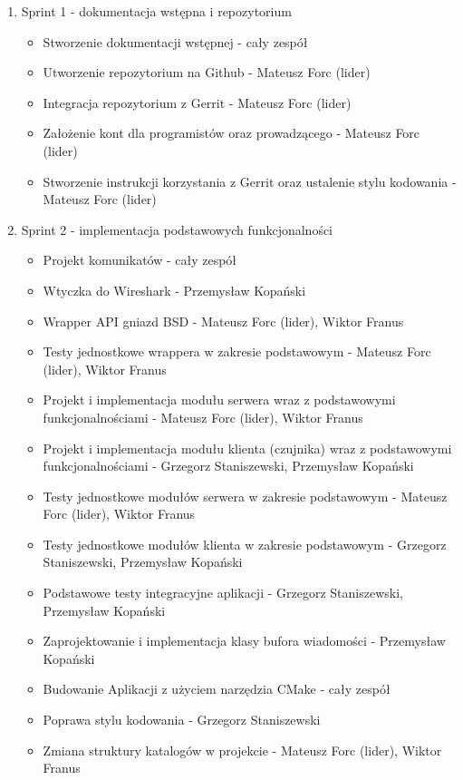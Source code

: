 \documentclass[a4paper,11pt]{article}
\begin{document}
\begin{enumerate}
\item Sprint 1 - dokumentacja wstępna i repozytorium
\begin{itemize}
\item Stworzenie dokumentacji wstępnej - cały zespół
\item Utworzenie repozytorium na Github - Mateusz Forc (lider)
\item Integracja repozytorium z Gerrit - Mateusz Forc (lider)
\item Założenie kont dla programistów oraz prowadzącego - Mateusz Forc (lider)
\item Stworzenie instrukcji korzystania z Gerrit oraz ustalenie stylu kodowania
      - Mateusz Forc (lider)
\end{itemize}
\item Sprint 2 - implementacja podstawowych funkcjonalności
\begin{itemize}
\item Projekt komunikatów - cały zespół
\item Wtyczka do Wireshark - Przemysław Kopański
\item Wrapper API gniazd BSD - Mateusz Forc (lider), Wiktor Franus
\item Testy jednostkowe wrappera w zakresie podstawowym - Mateusz Forc (lider), Wiktor Franus
\item Projekt i implementacja modułu serwera wraz z podstawowymi funkcjonalnościami
      - Mateusz Forc (lider), Wiktor Franus
\item Projekt i implementacja modułu klienta (czujnika) wraz z podstawowymi funkcjonalnościami
      - Grzegorz Staniszewski, Przemysław Kopański
\item Testy jednostkowe modułów serwera w zakresie podstawowym - Mateusz Forc (lider), Wiktor Franus
\item Testy jednostkowe modułów klienta w zakresie podstawowym
      - Grzegorz Staniszewski, Przemysław Kopański
\item Podstawowe testy integracyjne aplikacji - Grzegorz Staniszewski, Przemysław Kopański
\item Zaprojektowanie i implementacja klasy bufora wiadomości - Przemysław Kopański
\item Budowanie Aplikacji z użyciem narzędzia CMake - cały zespół
\item Poprawa stylu kodowania - Grzegorz Staniszewski
\item Zmiana struktury katalogów w projekcie - Mateusz Forc (lider), Wiktor Franus

\end{itemize}
\end{enumerate}
\end{document}
